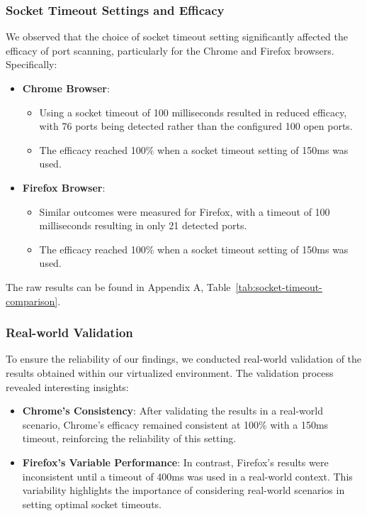 \subsubsection{Socket Timeout Settings and Efficacy}

We observed that the choice of socket timeout setting significantly affected the efficacy of port scanning, particularly for the Chrome and Firefox browsers. Specifically:

\begin{itemize}
    \item \textbf{Chrome Browser}:
    \begin{itemize}
        \item Using a socket timeout of 100 milliseconds resulted in reduced efficacy, with 76 ports being detected rather than the configured 100 open ports.
        \item The efficacy reached 100\% when a socket timeout setting of 150ms was used.
    \end{itemize}
    
    \item \textbf{Firefox Browser}:
    \begin{itemize}
        \item Similar outcomes were measured for Firefox, with a timeout of 100 milliseconds resulting in only 21 detected ports.
        \item The efficacy reached 100\% when a socket timeout setting of 150ms was used.
    \end{itemize}
\end{itemize}

The raw results can be found in Appendix A, Table~\ref{tab:socket-timeout-comparison}.

\subsubsection{Real-world Validation}

To ensure the reliability of our findings, we conducted real-world validation of the results obtained within our virtualized environment. The validation process revealed interesting insights:

\begin{itemize}
    \item \textbf{Chrome's Consistency}: After validating the results in a real-world scenario, Chrome's efficacy remained consistent at 100\% with a 150ms timeout, reinforcing the reliability of this setting.
    
    \item \textbf{Firefox's Variable Performance}: In contrast, Firefox's results were inconsistent until a timeout of 400ms was used in a real-world context. This variability highlights the importance of considering real-world scenarios in setting optimal socket timeouts.
\end{itemize}


